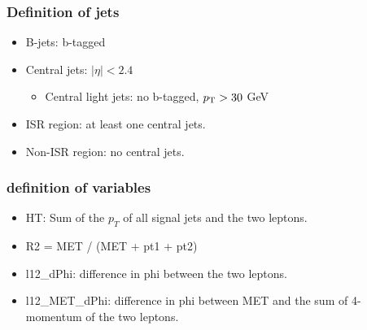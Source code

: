 \documentclass[mathserif,serif]{beamer}
\begin{document}
\begin{frame}
\frametitle{Definition of jets}
\normalsize
\begin{itemize}
\item B-jets: b-tagged
\item Central jets: $|\eta|<2.4$
\begin{itemize}
\item Central light jets: no b-tagged, $p_{\text{T}}>30$ GeV
\end{itemize}
\item ISR region: at least one central jets.
\item Non-ISR region: no central jets.
\end{itemize}
\end{frame}

\begin{frame}
\frametitle{definition of variables}
\normalsize
\begin{itemize}
\item HT: Sum of the $p_T$ of all signal jets and the two leptons.
\item R2 = MET / (MET + pt1 + pt2)
\item l12\_dPhi: difference in phi between the two leptons.
\item l12\_MET\_dPhi: difference in phi between MET and the sum of 4-momentum of the two leptons.
\end{itemize}
\end{frame}



\end{document}

